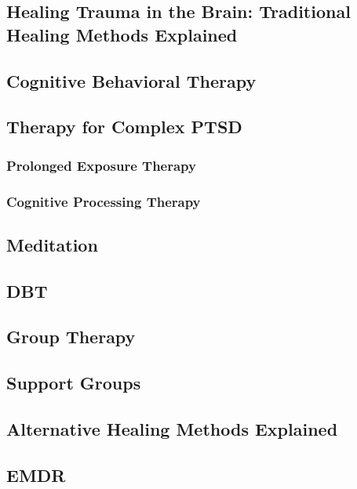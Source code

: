 \documentclass[oneside]{book}
\numberwithin{equation}{section}
\begin{document}
\subsection{Healing Trauma in the Brain: Traditional Healing Methods Explained}

\subsection{Cognitive Behavioral Therapy}

\subsection{Therapy for Complex PTSD}

\subsubsection{Prolonged Exposure Therapy}

\subsubsection{Cognitive Processing Therapy}

\subsection{Meditation}

\subsection{DBT}

\subsection{Group Therapy}

\subsection{Support Groups}

\subsection{Alternative Healing Methods Explained}

\subsection{EMDR}
\end{document}
